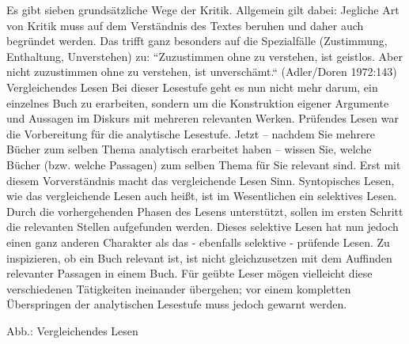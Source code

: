 \documentclass[]{book}
\theoremstyle{definition}
\theoremstyle{definition}
\theoremstyle{definition}
\theoremstyle{remark}
\begin{document}
Es gibt sieben grundsätzliche Wege der Kritik. Allgemein gilt dabei:
Jegliche Art von Kritik muss auf dem Verständnis des Textes beruhen und
daher auch begründet werden. Das trifft ganz besonders auf die
Spezialfälle (Zustimmung, Enthaltung, Unverstehen) zu: ``Zuzustimmen
ohne zu verstehen, ist geistlos. Aber nicht zuzustimmen ohne zu
verstehen, ist unverschämt.`` (Adler/Doren 1972:143) Vergleichendes
Lesen Bei dieser Lesestufe geht es nun nicht mehr darum, ein einzelnes
Buch zu erarbeiten, sondern um die Konstruktion eigener Argumente und
Aussagen im Diskurs mit mehreren relevanten Werken. Prüfendes Lesen war
die Vorbereitung für die analytische Lesestufe. Jetzt -- nachdem Sie
mehrere Bücher zum selben Thema analytisch erarbeitet haben -- wissen
Sie, welche Bücher (bzw. welche Passagen) zum selben Thema für Sie
relevant sind. Erst mit diesem Vorverständnis macht das vergleichende
Lesen Sinn. Syntopisches Lesen, wie das vergleichende Lesen auch heißt,
ist im Wesentlichen ein selektives Lesen. Durch die vorhergehenden
Phasen des Lesens unterstützt, sollen im ersten Schritt die relevanten
Stellen aufgefunden werden. Dieses selektive Lesen hat nun jedoch einen
ganz anderen Charakter als das - ebenfalls selektive - prüfende Lesen.
Zu inspizieren, ob ein Buch relevant ist, ist nicht gleichzusetzen mit
dem Auffinden relevanter Passagen in einem Buch. Für geübte Leser mögen
vielleicht diese verschiedenen Tätigkeiten ineinander übergehen; vor
einem kompletten Überspringen der analytischen Lesestufe muss jedoch
gewarnt werden.

Abb.: Vergleichendes Lesen
\end{document}
